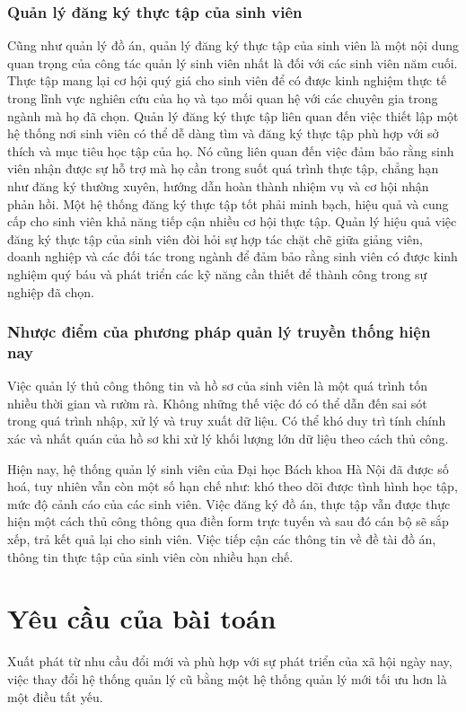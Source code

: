 \subsubsection*{Quản lý đăng ký thực tập của sinh viên}
	Cũng như quản lý đồ án, quản lý đăng ký thực tập của sinh viên là một nội dung quan trọng của công tác quản lý sinh viên nhất là đối với các sinh viên năm cuối.
	Thực tập mang lại cơ hội quý giá cho sinh viên để có được kinh nghiệm thực tế trong lĩnh vực nghiên cứu của họ và tạo mối quan hệ với các chuyên gia trong ngành mà họ đã chọn.
	Quản lý đăng ký thực tập liên quan đến việc thiết lập một hệ thống nơi sinh viên có thể dễ dàng tìm và đăng ký thực tập phù hợp với sở thích và mục tiêu học tập của họ.
	Nó cũng liên quan đến việc đảm bảo rằng sinh viên nhận được sự hỗ trợ mà họ cần trong suốt quá trình thực tập, chẳng hạn như đăng ký thường xuyên, hướng dẫn hoàn thành nhiệm vụ và cơ hội nhận phản hồi.
	Một hệ thống đăng ký thực tập tốt phải minh bạch, hiệu quả và cung cấp cho sinh viên khả năng tiếp cận nhiều cơ hội thực tập.
	Quản lý hiệu quả việc đăng ký thực tập của sinh viên đòi hỏi sự hợp tác chặt chẽ giữa giảng viên, doanh nghiệp và các đối tác trong ngành để đảm bảo rằng sinh viên có được kinh nghiệm quý báu và phát triển các kỹ năng cần thiết để thành công trong sự nghiệp đã chọn.

\subsubsection*{Nhược điểm của phương pháp quản lý truyền thống hiện nay}
	Việc quản lý thủ công thông tin và hồ sơ của sinh viên là một quá trình tốn nhiều thời gian và rườm rà. 
	Không những thế việc đó có thể dẫn đến sai sót trong quá trình nhập, xử lý và truy xuất dữ liệu.
	Có thể khó duy trì tính chính xác và nhất quán của hồ sơ khi xử lý khối lượng lớn dữ liệu theo cách thủ công.

	Hiện nay, hệ thống quản lý sinh viên của Đại học Bách khoa Hà Nội đã được số hoá, tuy nhiên vẫn còn một số hạn chế như: 
	khó theo dõi được tình hình học tập, mức độ cảnh cáo của các sinh viên.
	Việc đăng ký đồ án, thực tập vẫn được thực hiện một cách thủ công thông qua điền form trực tuyến và sau đó cán bộ sẽ sắp xếp, trả kết quả lại cho sinh viên.
	Việc tiếp cận các thông tin về đề tài đồ án, thông tin thực tập của sinh viên còn nhiều hạn chế.

\section{Yêu cầu của bài toán}
Xuất phát từ nhu cầu đổi mới và phù hợp với sự phát triển của xã hội ngày nay, việc thay đổi hệ thống quản lý cũ bằng một hệ thống quản lý mới tối ưu hơn là một điều tất yếu.

